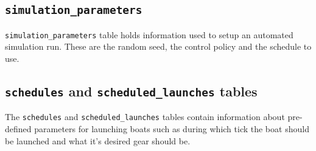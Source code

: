 \subsection{\texttt{simulation\_parameters}}
\texttt{simulation\_parameters} table holds information used to setup
an automated simulation run. These are the random seed, the control
policy and the schedule to use.

\subsection{\texttt{schedules} and \texttt{scheduled\_launches}
  tables}
The \texttt{schedules} and \texttt{scheduled\_launches} tables contain
information about pre-defined parameters for launching boats such as
during which tick the boat should be launched and what it's desired
gear should be.


